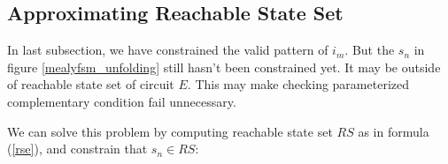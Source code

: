 \documentclass[journal]{IEEEtran}
\begin{document}
\subsection{Approximating Reachable State Set}\label{subsec_Prfx}
In last subsection, we have constrained the valid pattern of $i_m$.
But the $s_n$ in figure \ref{mealyfsm_unfolding} still hasn't been constrained yet.
It may be outside of reachable state set of circuit $E$.
This may make checking parameterized complementary condition fail unnecessary.

We can solve this problem by computing reachable state set $RS$ as in formula (\ref{rse}),
and constrain that $s_n\in RS$:

\begin{equation}\label{rse_p_forward}
\end{equation}

\vspace{0.2cm}
\end{document}
